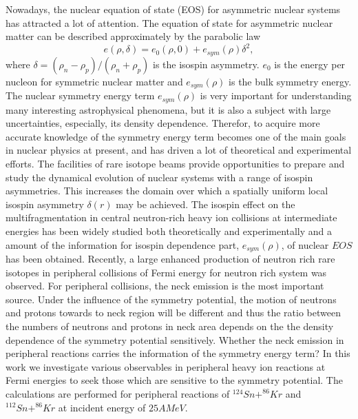 \documentclass[aps,prc,groupedaddress,showpacs,manuscript]{revtex4}
\begin{document}
 Nowadays, the nuclear equation of state (EOS) for asymmetric
nuclear systems has attracted a lot of attention. The equation of
state for asymmetric nuclear matter can be described approximately
by the parabolic law
\begin{equation}
e(\rho,\delta)=e_{0}(\rho,0)+e_{sym}(\rho)\delta^{2},
\end{equation}
where $\delta=(\rho_{n}-\rho_{p})/(\rho_{n}+\rho_{p})$ is the
isospin asymmetry. $e_{0}$ is the energy per nucleon for symmetric
nuclear matter and $e_{sym}(\rho)$ is the bulk symmetry energy.
The nuclear symmetry energy term $e_{sym}(\rho)$ is very important
for understanding many interesting astrophysical phenomena, but it
is also a subject with large uncertainties, especially, its
density dependence\cite{Br00,BALi97,BALi02}. Therefor, to acquire
more accurate knowledge of the symmetry energy term becomes one of
the main goals in nuclear physics at present, and has driven a lot
of theoretical and experimental efforts. The facilities of rare
isotope beams provide opportunities to prepare and study the
dynamical evolution of nuclear systems with a range of isospin
asymmetries. This increases the domain over which a spatially
uniform local isospin asymmetry $\delta(r)$ may be achieved. The
isospin effect on the multifragmentation in central neutron-rich
heavy ion collisions at intermediate energies has been widely
studied both theoretically and experimentally and a amount of the
information for isospin dependence part, $e_{sym}(\rho)$, of
nuclear $EOS$ has been
obtained\cite{BALi97,Xu00,Dan02,BALi01,Li01,Tsa01,Tan,Ver01,Bar02}.
Recently, a large enhanced production of neutron rich rare
isotopes in peripheral collisions of Fermi energy for neutron rich
system was observed\cite{Sou03,Ves03}. For peripheral collisions,
the neck emission is the most important source. Under the
influence of the symmetry potential, the motion of neutrons and
protons towards to neck region will be different and thus the
ratio between the numbers of neutrons and protons in neck area
depends on the the density dependence of the symmetry potential
sensitively. Whether the neck emission in peripheral reactions
carries the information of the symmetry energy term? In this work
we investigate various observables in peripheral heavy ion
reactions at Fermi energies to seek those which are sensitive to
the symmetry potential. The calculations are performed for
peripheral reactions of $^{124}Sn+^{86}Kr$ and $^{112}Sn+^{86}Kr$
at incident energy of $25AMeV$.
\end{document}

